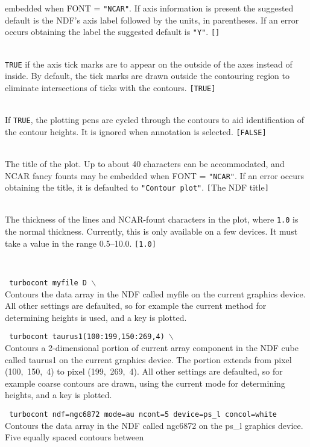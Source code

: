 \documentclass[twoside,11pt]{article}
\newcommand{\htmlref}[2]{#1}
\newcommand{\sstexamples}[1]{
   \goodbreak
   \item[Examples:] \mbox{} \\
   \vspace{-3.5ex}
   \begin{description}
      #1
   \end{description}
}
\newcommand{\sstsubsection}[1]{ \item[{#1}] \mbox{} \\}
\newcommand{\sstexamplesubsection}[2]{\sloppy \item{\ssttt #1} \mbox{} \\ #2 }
\newcommand{\ssttt}{\tt}
\newcommand{\sstexamples}[1]{%
      \item[\htmlref{Examples:}{ap:example}]%
      \begin{description}
         #1
      \end{description}
   }
\newcommand{\sstsubsection}[1]{\item[{#1}]}
\newcommand{\sstexamplesubsection}[2]{%
      \item[{\ssttt #1}]
      #2\smallskip%
   }
\begin{document}
{{{         embedded when FONT = {\tt "NCAR"}.  If axis information is
         present the suggested default is the NDF's axis label followed
         by the units, in parentheses.  If an error occurs obtaining
         the label the suggested default is {\tt "Y"}. {\tt []}
      }
      \sstsubsection{
         OUTTIC = \_LOGICAL (Read)
      }{
         {\tt TRUE} if the axis tick marks are to appear on the outside of
         the axes instead of inside.  By default, the tick marks are
         drawn outside the contouring region to eliminate
         intersections of ticks with the contours. {\tt [TRUE]}
      }
      \sstsubsection{
         PENROT = \_LOGICAL (Read)
      }{
         If {\tt TRUE}, the plotting pens are cycled through the contours to
         aid identification of the contour heights.  It is ignored
         when annotation is selected. {\tt [FALSE]}
      }
      \sstsubsection{
         PLTITL = LITERAL (Read)
      }{
         The title of the plot.  Up to about 40 characters can be
         accommodated, and NCAR fancy founts may be embedded when
         FONT = {\tt "NCAR"}.  If an error occurs obtaining the title, it
         is defaulted to {\tt "Contour plot"}. {\tt [}The NDF title{\tt ]}
      }
      \sstsubsection{
         THICK = \_REAL (Read)
      }{
         The thickness of the lines and NCAR-fount characters in the plot, where
         {\tt 1.0} is the normal thickness.  Currently, this is only available
         on a few devices.  It must take a value in the range 0.5--10.0.
         {\tt [1.0]}
      }
   }
   \sstexamples{
      \sstexamplesubsection{
         turbocont myfile D $\backslash$
      }{
         Contours the data array in the NDF called myfile on the current
         graphics device.  All other settings are defaulted, so for
         example the current method for determining heights is used, and
         a key is plotted.
      }
      \sstexamplesubsection{
         turbocont taurus1(100:199,150:269,4) $\backslash$
      }{
         Contours a 2-dimensional portion of current array component in
         the NDF cube called taurus1 on the current graphics device.
         The portion extends from pixel (100,~150,~4) to pixel
         (199,~269,~4).  All other settings are defaulted, so for example
         coarse contours are drawn, using the current mode for
         determining heights, and a key is plotted.
      }
      \sstexamplesubsection{
         turbocont ndf=ngc6872 mode=au ncont=5 device=ps\_l concol=white
      }{
         Contours the data array in the NDF called ngc6872 on the
         ps\_l graphics device.  Five equally spaced contours between
}}}
\end{document}
